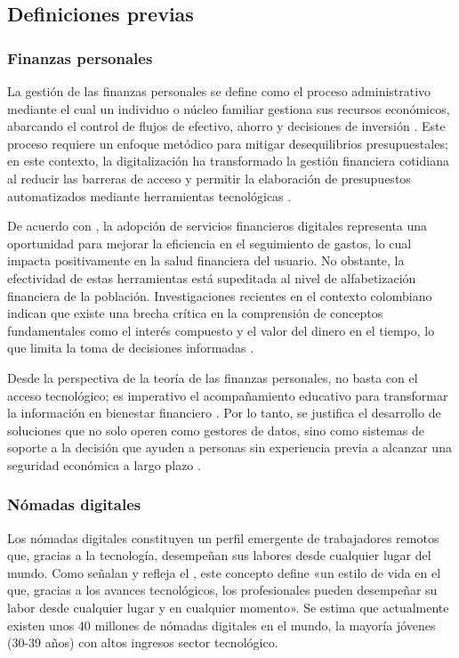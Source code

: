\subsection*{Definiciones previas}

\subsubsection*{Finanzas personales}

La gestión de las finanzas personales se define como el proceso administrativo mediante el cual un individuo o núcleo familiar gestiona sus recursos económicos, abarcando el control de flujos de efectivo, ahorro y decisiones de inversión \parencite{UniversidadLibre01}. Este proceso requiere un enfoque metódico para mitigar desequilibrios presupuestales; en este contexto, la digitalización ha transformado la gestión financiera cotidiana al reducir las barreras de acceso y permitir la elaboración de presupuestos automatizados mediante herramientas tecnológicas \parencite{CESA01}.

De acuerdo con \textcite{Asobancaria01}, la adopción de servicios financieros digitales representa una oportunidad para mejorar la eficiencia en el seguimiento de gastos, lo cual impacta positivamente en la salud financiera del usuario. No obstante, la efectividad de estas herramientas está supeditada al nivel de alfabetización financiera de la población. Investigaciones recientes en el contexto colombiano indican que existe una brecha crítica en la comprensión de conceptos fundamentales como el interés compuesto y el valor del dinero en el tiempo, lo que limita la toma de decisiones informadas \parencite[p.~4]{Departamento01}.

Desde la perspectiva de la teoría de las finanzas personales, no basta con el acceso tecnológico; es imperativo el acompañamiento educativo para transformar la información en bienestar financiero \parencite{Inclusionfinan01}. Por lo tanto, se justifica el desarrollo de soluciones que no solo operen como gestores de datos, sino como sistemas de soporte a la decisión que ayuden a personas sin experiencia previa a alcanzar una seguridad económica a largo plazo \parencite{Departamento01}.

\subsubsection*{Nómadas digitales}
Los nómadas digitales constituyen un perfil emergente de trabajadores remotos que, gracias a la tecnología, desempeñan sus labores desde cualquier lugar del mundo. Como señalan \textcite{Recordar01} y refleja el \textcite{BBVA01}, este concepto define «un estilo de vida en el que, gracias a los avances tecnológicos, los profesionales pueden desempeñar su labor desde cualquier lugar y en cualquier momento». Se estima que actualmente existen unos 40 millones de nómadas digitales en el mundo, la mayoría jóvenes (30-39 años) con altos ingresos sector tecnológico.

